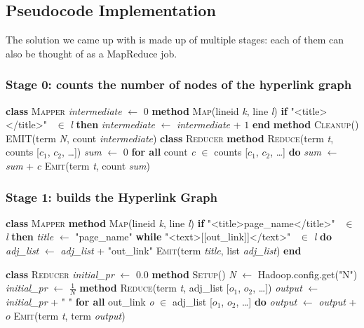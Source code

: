 \documentclass[11pt,a4paper]{article}
\begin{document}
\subsection{Pseudocode Implementation}
The solution we came up with is made up of multiple stages: each of them can also be thought of as a MapReduce job.
\subsubsection*{Stage 0: counts the number of nodes of the hyperlink graph}
\begin{algorithm}[H]
\textbf{class} \textsc{Mapper}\;
\Indp\textit{intermediate} $\leftarrow$ $0$\;
\textbf{method} \textsc{Map}(lineid \textit{k}, line \textit{l})\;
\Indp\textbf{if} "\textless title\textgreater *\textless /title\textgreater" \ $\in$ \textit{l} \textbf{then}\;
\Indp\textit{intermediate} $\leftarrow$ \textit{intermediate} + $1$\;
\Indm\textbf{end}\;
\;
\Indm\textbf{method} \textsc{Cleanup}()\;
\Indp\textsc{EMIT}(term \textit{N}, count \textit{intermediate})\;
\Indm\Indm\;
\textbf{class} \textsc{Reducer}\;
\Indp\textbf{method} \textsc{Reduce}(term \textit{t}, counts [$c_1$, $c_2$, \dots])\;
\Indp\textit{sum} $\leftarrow$ $0$\;
\textbf{for all} count \textit{c} $\in$ counts [$c_1$, $c_2$, \dots] \textbf{do}\;
\Indp\textit{sum} $\leftarrow$ \textit{sum} + $c$\;
\Indm\textsc{Emit}(term \textit{t}, count \textit{sum})
\end{algorithm}
\subsubsection*{Stage 1: builds the Hyperlink Graph}
\begin{algorithm}[H]
\textbf{class} \textsc{Mapper}\;
\Indp\textbf{method} \textsc{Map}(lineid \textit{k}, line \textit{l})\;
\Indp\textbf{if} "\textless title\textgreater page\_name\textless /title\textgreater" \ $\in$ \textit{l} \textbf{then}\;
\Indp\textit{title} $\leftarrow$ "page\_name"\;
\textbf{while} "\textless text\textgreater [[out\_link]]\textless /text\textgreater" \ $\in$ \textit{l} \textbf{do}\;
\Indp\textit{adj\_list} $\leftarrow$ \textit{adj\_list} + "out\_link"\;
\Indm\textsc{Emit}(term \textit{title}, list \textit{adj\_list})\;
\Indm\textbf{end}\;
\end{algorithm}
\clearpage
\begin{algorithm}[H]
\textbf{class} \textsc{Reducer}\;
\Indp\textit{initial\_pr} $\leftarrow$ $0.0$\;
\textbf{method} \textsc{Setup}()\;
\Indp\textit{N} $\leftarrow$ Hadoop.config.get("N")\;
\textit{initial\_pr} $\leftarrow$ $\frac{1}{N}$\;
\Indm\;
\textbf{method} \textsc{Reduce}(term \textit{t}, adj\_list [$o_1$, $o_2$, \dots])\;
\Indp\textit{output} $\leftarrow$ \textit{initial\_pr} + " "\;
\textbf{for all} out\_link \textit{o} $\in$ adj\_list [$o_1$, $o_2$, \dots] \textbf{do}\;
\Indp\textit{output} $\leftarrow$ \textit{output} + $o$\;
\Indm\textsc{Emit}(term \textit{t}, term \textit{output})
\end{algorithm}
\end{document}
